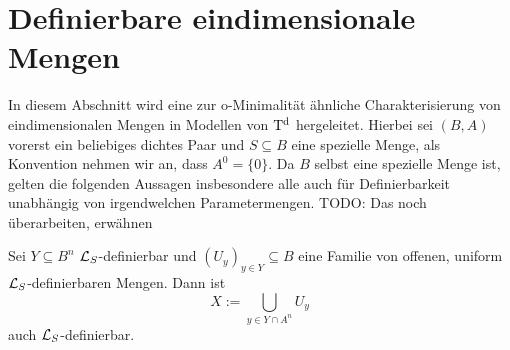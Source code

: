 \section{Definierbare eindimensionale Mengen}
In diesem Abschnitt wird eine zur o-Minimalität ähnliche Charakterisierung von eindimensionalen Mengen in Modellen von $\operatorname{T^d}$ hergeleitet. Hierbei sei $(B,A)$ vorerst ein beliebiges dichtes Paar und $S\subseteq B$ eine spezielle Menge, als Konvention nehmen wir an, dass $A^0=\{0\}$. Da $B$ selbst eine spezielle Menge ist, gelten die folgenden Aussagen insbesondere alle auch für Definierbarkeit unabhängig von irgendwelchen Parametermengen.
TODO: Das noch überarbeiten, \cite{Piz} erwähnen

\begin{lemma}
	Sei $Y\subseteq B^n$ $\mathcal{L}_S$-definierbar und $(U_y)_{y\in Y}\subseteq B$ eine Familie von offenen, uniform $\mathcal{L}_S$-definierbaren Mengen. Dann ist $$X:=\bigcup\limits_{y\in Y\cap A^n}U_y$$ auch $\mathcal{L}_S$-definierbar.
\end{lemma}

